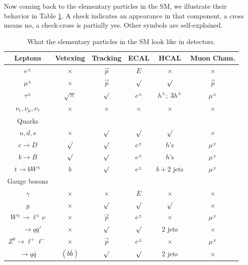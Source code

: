 \documentclass[12pt,prd,aps,floats,preprintnumbers,preprint,superscriptaddress,floatfix,nofootinbib]{revtex4}
\begin{document}
Now coming back to the elementary particles in the SM, we 
illustrate their behavior  in Table \ref{detectsm}. 
A check indicates an appearance in that component, a cross
means no, a check-cross is partially yes. Other symbols are self-explained.

\begin{table}[htb]
\begin{tabular}{|c|c c c c c |} 
\hline
Leptons  & Vetexing   & Tracking &  ECAL &  HCAL & Muon Cham. \\
\hline$e^\pm$ & $\times$ & $\vec p$ &   $E$   &   $\times$        & $\times$      \\
$\mu^\pm$  &  $\times$ &  $\vec p$   &   $\surd$    &  $\surd$   & $\vec p$ \\
$\tau^\pm$  & $\surd\times$  & $\surd $   &   $e^\pm$    &  $h^\pm;\ 3h^\pm$   & $\mu^\pm$ \\
$\nu_e,\nu_\mu,\nu_\tau$ & $\times$  & $\times$      &   $\times$   &   $\times$    & $\times$     \\
\hline
Quarks  &  & & & & \\
\hline
$u,d,s$ &  $\times$ & $\surd$  & $\surd$  & $\surd$     & $\times$      \\
$c\to D$    &  $\surd$ &   $\surd$ &   $e^\pm$    &  $h$'s  & $\mu^\pm$ \\
$b\to B$   &  $\surd$  & $\surd$   &   $e^\pm$    &  $h$'s  & $\mu^\pm$ \\
$t\to bW^\pm$ &  $b$  &  $\surd$  &   $e^\pm$    &  $b+2$ jets  & $\mu^\pm$ \\
\hline
Gauge bosons  &  & & & & \\
\hline
$\gamma$ & $\times$  & $\times$ &   $E$   &   $\times$        & $\times$      \\
$g$  &  $\times$ &  $\surd$  &   $\surd$    &  $\surd$   & $\times$ \\
$W^\pm\to \ell^\pm \nu$ &  $\times$ & $\vec p$  &   $e^\pm$    &  $\times$  & $\mu^\pm$ \\
$\quad~ \to q\bar q'$ &  $\times$ &  $\surd$ &   $\surd$    &  2 jets  & $\times$ \\
$ Z^0\to \ell^+\ell^-$ &  $\times$  & $\vec p$  &   $e^\pm$    &  $\times$ & $\mu^\pm$ \\
$ \to q\bar q$ &  $(b\bar b)$  & $\surd$  &   $\surd$    &  2 jets  & $\times$ \\
\hline
\end{tabular}
\caption{What the elementary particles in the SM look like in detectors.}
\label{detectsm} 
\end{table}
\end{document}
